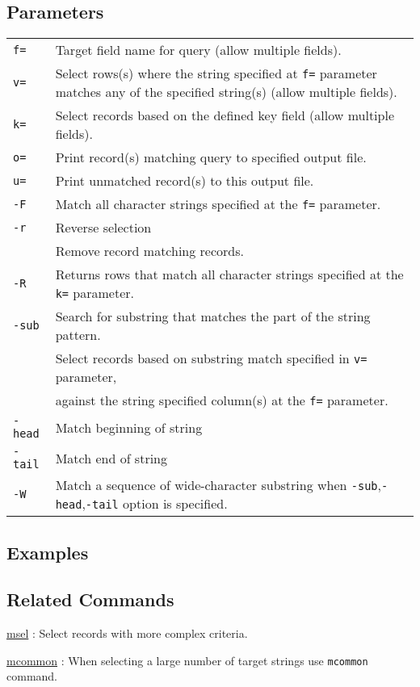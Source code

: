 \subsection*{Parameters}
\begin{table}[htbp]
{\small
\begin{tabular}{ll}
\verb|f=|    & Target field name for query (allow multiple fields).\\
\verb|v=|    & Select rows(s) where the string specified at \verb|f=| parameter matches any of the specified string(s) (allow multiple fields). \\
\verb|k=|    & Select records based on the defined key field  (allow multiple fields).  \\
\verb|o=|    & Print record(s) matching query to specified output file.   \\
\verb|u=|    &  Print unmatched record(s) to this output file. \\
\verb|-F|    &  Match all character strings specified at the \verb|f=| parameter. \\
\verb|-r|    & Reverse selection \\
             & Remove record matching records. \\
\verb|-R|    & Returns rows that match all character strings specified at the \verb|k=| parameter.\\
\verb|-sub|  & Search for substring that matches the part of the string pattern.  \\
             & Select records based on substring match specified in \verb|v=| parameter, \\	
             & against the string specified column(s) at the \verb|f=| parameter. \\
\verb|-head| & Match beginning of string \\
\verb|-tail| & Match end of string  \\
\verb|-W|    & Match a sequence of wide-character substring when \verb|-sub|,\verb|-head|,\verb|-tail| option is specified. \\

\end{tabular} 
}
\end{table} 

\subsection*{Examples}


\subsection*{Related Commands}
\hyperref[sect:msel] {msel} : Select records with more complex criteria. 

\hyperref[sect:mcommon] {mcommon} : When selecting a large number of target strings use \verb|mcommon| command. 


%
